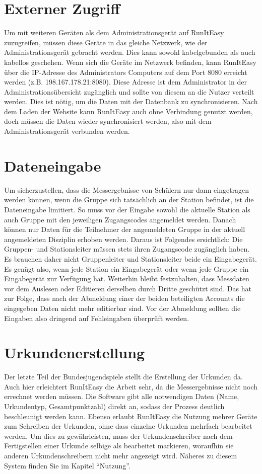 \documentclass[11pt,a4paper,titlepage,german]{article}
\begin{document}
		\section{Externer Zugriff}
			Um mit weiteren Geräten als dem Administrationsgerät auf RunItEasy zuzugreifen, müssen diese Geräte in das gleiche Netzwerk, wie der Administrationsgerät gebracht werden. Dies kann sowohl kabelgebunden als auch kabellos geschehen. Wenn sich die Geräte im Netzwerk befinden, kann RunItEasy über die IP-Adresse des Administrators Computers auf dem Port 8080 erreicht werden (z.B. 198.167.178.21:8080). Diese Adresse ist dem Administrator in der Administrationsübersicht zugänglich und sollte von diesem an die Nutzer verteilt werden. Dies ist nötig, um die Daten mit der Datenbank zu synchronisieren. Nach dem Laden der Website kann RunItEasy auch ohne Verbindung genutzt werden, doch müssen die Daten wieder synchronisiert werden, also mit dem Administrationsgerät verbunden werden.
			
		\section{Dateneingabe}
			Um sicherzustellen, dass die Messergebnisse von Schülern nur dann eingetragen werden können, wenn die Gruppe sich tatsächlich an der Station befindet, ist die Dateneingabe limitiert. So muss vor der Eingabe sowohl die aktuelle Station als auch Gruppe mit den jeweiligen Zugangscodes angemeldet werden. Danach können nur Daten für die Teilnehmer der angemeldeten Gruppe in der aktuell angemeldeten Disziplin erhoben werden. Daraus ist Folgendes ersichtlich:
			Die Gruppen- und Stationsleiter müssen stets ihren Zugangscode zugänglich haben. Es brauchen daher nicht Gruppenleiter und Stationsleiter beide ein Eingabegerät. Es genügt also, wenn jede Station ein Eingabegerät oder wenn jede Gruppe ein Eingabegerät zur Verfügung hat.
			Weiterhin bleibt festzuhalten, dass Messdaten vor dem Auslesen oder Editieren derselben durch Dritte geschützt sind. Das hat zur Folge, dass nach der Abmeldung einer der beiden beteiligten Accounts die eingegeben Daten nicht mehr editierbar sind. Vor der Abmeldung sollten die Eingaben also dringend auf Fehleingaben überprüft werden.
			
		\section{Urkundenerstellung}
			Der letzte Teil der Bundesjugendspiele stellt die Erstellung der Urkunden da. Auch hier erleichtert RunItEasy die Arbeit sehr, da die Messergebnisse nicht noch errechnet werden müssen. Die Software gibt alle notwendigen Daten (Name, Urkundentyp, Gesamtpunktzahl) direkt an, sodass der Prozess deutlich beschleunigt werden kann.
			Ebenso erlaubt RunItEasy die Nutzung mehrer Geräte zum Schreiben der Urkunden, ohne dass einzelne Urkunden mehrfach bearbeitet werden. Um dies zu gewährleisten, muss der Urkundenschreiber nach dem Fertigstellen einer Urkunde selbige als bearbeitet markieren, woraufhin sie anderen Urkundenschreibern nicht mehr angezeigt wird. Näheres zu diesem System finden Sie im Kapitel “Nutzung”.
		
\end{document}
